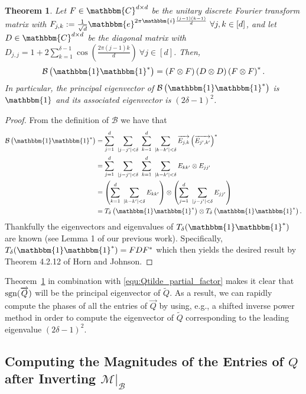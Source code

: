 \documentclass[]{spie}  %
\newtheorem{thm}{Theorem}
\def \vec{\overrightarrow}
\def \B {\mathcal{B}}
\def \one { \mathbbm{1}}
\def \e { \mathbbm{e}}
\def \i { \mathbbm{i}}
\def \sgn {{\rm sgn}}
\begin{document}
\begin{thm} 
Let $F \in \mathbbm{C}^{d \times d}$ be the unitary discrete Fourier transform matrix with $F_{j,k} := \frac{1}{\sqrt{d}} \e^{2 \pi \i \frac{(j-1)(k-1)}{d}} ~\forall j,k \in [d]$, and let $D \in \mathbbm{C}^{d \times d}$ be the diagonal matrix with $D_{j,j} = 1 + 2 \sum^{\delta-1}_{k=1} \cos \left( \frac{2 \pi (j-1)k}{d} \right)~\forall j \in [d]$.  Then,
$$\B \left( \one \one^* \right) = \left( F \otimes F \right) \left( D \otimes D \right) \left( F \otimes F \right)^*.$$
In particular, the principal eigenvector of $\B \left( \one \one^* \right)$ is $\one$ and its associated eigenvector is $(2 \delta - 1)^2$. 
\label{thm:Factorized_P11}
\end{thm}

\begin{proof}
From the definition of $\B$ we have that 
\begin{align*}
  \B \left( \one \one^* \right) &= \sum^d_{j=1} ~\sum_{|j - j'| < \delta} ~\sum^d_{k=1} ~\sum_{|k - k'| < \delta}\vec{E_{j,k}} \left(\vec{E_{j',k'}} \right)^* \\
  &= \sum^d_{j=1} ~\sum_{|j - j'| < \delta} ~\sum^d_{k=1} ~\sum_{|k - k'| < \delta} E_{kk'} \otimes E_{jj'} \\
  &= \left(\sum^d_{k=1} ~\sum_{|k - k'| < \delta} E_{kk'}\right) \otimes \left( \sum^d_{j=1} ~\sum_{|j - j'| < \delta} E_{jj'} \right) \\
  &= T_\delta\left(\one \one^*\right) \otimes T_\delta \left(\one \one^*\right).
\end{align*}
Thankfully the eigenvectors and eigenvalues of $T_\delta(\one \one^*)$ are known (see Lemma 1 of our previous work\cite{iwen2016phase}).  Specifically, $T_\delta(\one \one^*) = F D F^*$ which then yields the desired result by Theorem 4.2.12 of Horn and Johnson\cite{horn1991topics}.
\end{proof}

Theorem~\ref{thm:Factorized_P11} in combination with \eqref{equ:Qtilde_partial_factor} makes it clear that $\sgn (\vec{Q})$ will be the principal eigenvector of $\widetilde{Q}$.  As a result, we can rapidly compute the phases of all the entries of $\vec{Q}$ by using, e.g., a shifted inverse power method\cite{trefethen1997numerical} in order to compute the eigenvector of $\widetilde{Q}$ corresponding to the leading eigenvalue $(2 \delta - 1)^2$. 

\subsection{Computing the Magnitudes of the Entries of $Q$ after Inverting $\mathcal{M} \big|_{\B}$}
\label{sec:Getmags}
\end{document}
